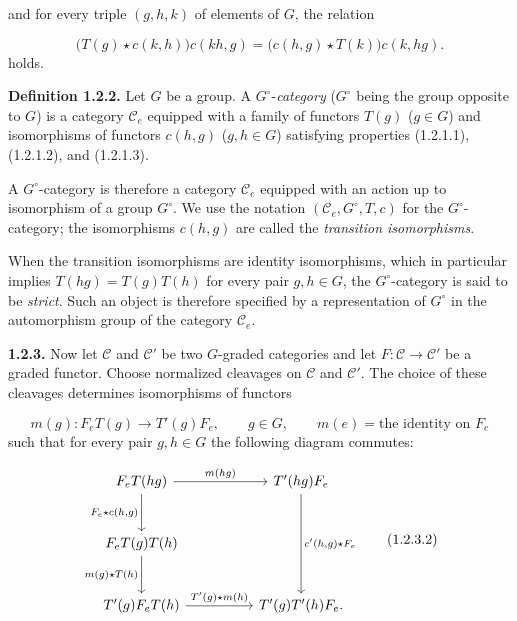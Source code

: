%
and for every triple $(g,h,k)$ of elements of $G$, the relation

\begin{equation}
  \bigl(T(g)\star c(k,h)\bigr)c(kh,g)
  =\bigl(c(h,g)\star T(k)\bigr)c(k,hg).
  \tag{1.2.1.3}
\end{equation}
holds.

\noindent\textbf{Definition 1.2.2.}\quad
Let $G$ be a group. A $G^\circ$-\emph{category}
($G^\circ$ being the group opposite to $G$) is a category $\mathcal C_e$
equipped with a family of functors $T(g)$ ($g\in G$) and isomorphisms of
functors $c(h,g)$ ($g,h\in G$) satisfying properties (1.2.1.1),
(1.2.1.2), and (1.2.1.3).

A $G^\circ$-category is therefore a category $\mathcal C_e$ equipped with
an action up to isomorphism of a group $G^\circ$. We use the notation
$(\mathcal C_e,G^\circ,T,c)$ for the $G^\circ$-category; the isomorphisms
$c(h,g)$ are called the \emph{transition isomorphisms}.

When the transition isomorphisms are identity isomorphisms, which in
particular implies $T(hg)=T(g)T(h)$ for every pair $g,h\in G$, the
$G^\circ$-category is said to be \emph{strict}. Such an object is therefore
specified by a representation of $G^\circ$ in the automorphism group of
the category $\mathcal C_e$.

\noindent\textbf{1.2.3.}\quad
Now let $\mathcal C$ and $\mathcal C'$ be two $G$-graded categories and let
$F\colon\mathcal C\to\mathcal C'$ be a graded functor. Choose normalized
cleavages on $\mathcal C$ and $\mathcal C'$. The choice of these cleavages
determines isomorphisms of functors

\begin{equation}
  m(g)\colon F_eT(g)\longrightarrow T'(g)F_e,\qquad
  g\in G,\qquad m(e)=\text{the identity on }F_e
  \tag{1.2.3.1}
\end{equation}
such that for every pair $g,h\in G$ the following diagram commutes:

\begin{equation}
\begin{tikzcd}[column sep=huge,row sep=large]
F_eT(hg)
  \arrow[r,"m(hg)"]
  \arrow[d,"{F_e\star c(h,g)}",swap]
&
T^{\prime}(hg)F_e
  \arrow[dd,"{c^{\prime}(h,g)\star F_e}"]
\\
F_eT(g)T(h)
  \arrow[d,"m(g)\star T(h)",swap]
&
{}
\\
T^{\prime}(g)F_eT(h)
  \arrow[r,"T^{\prime}(g)\star m(h)"]
&
T^{\prime}(g)T^{\prime}(h)F_e\mathpunct{.}
\end{tikzcd}
\tag{1.2.3.2}
\end{equation}

